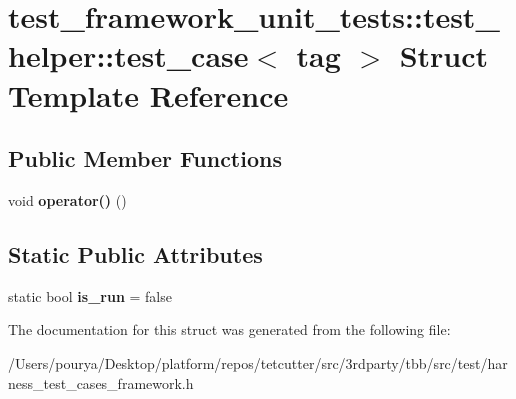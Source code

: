 \hypertarget{structtest__framework__unit__tests_1_1test__helper_1_1test__case}{}\section{test\+\_\+framework\+\_\+unit\+\_\+tests\+:\+:test\+\_\+helper\+:\+:test\+\_\+case$<$ tag $>$ Struct Template Reference}
\label{structtest__framework__unit__tests_1_1test__helper_1_1test__case}
\subsection*{Public Member Functions}
\begin{DoxyCompactItemize}
\item 
\hypertarget{structtest__framework__unit__tests_1_1test__helper_1_1test__case_abb32aca24b79757bcb9336deac40cc2d}{}void {\bfseries operator()} ()\label{structtest__framework__unit__tests_1_1test__helper_1_1test__case_abb32aca24b79757bcb9336deac40cc2d}

\end{DoxyCompactItemize}
\subsection*{Static Public Attributes}
\begin{DoxyCompactItemize}
\item 
\hypertarget{structtest__framework__unit__tests_1_1test__helper_1_1test__case_a15c02768308bdc1c2870e0784827ce5b}{}static bool {\bfseries is\+\_\+run} = false\label{structtest__framework__unit__tests_1_1test__helper_1_1test__case_a15c02768308bdc1c2870e0784827ce5b}

\end{DoxyCompactItemize}


The documentation for this struct was generated from the following file\+:\begin{DoxyCompactItemize}
\item 
/\+Users/pourya/\+Desktop/platform/repos/tetcutter/src/3rdparty/tbb/src/test/harness\+\_\+test\+\_\+cases\+\_\+framework.\+h\end{DoxyCompactItemize}
